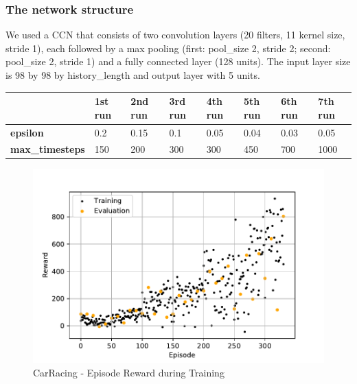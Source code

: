 \documentclass[
        a4paper,
        10pt,
        parskip = full,    %
    ]{scrartcl}
\begin{document}
\subsubsection{The network structure}
We used a CCN that consists of two convolution layers (20 filters, 11 kernel size, stride 1), each followed by a max
pooling (first: pool\_size 2, stride 2; second: pool\_size 2, stride 1) and a fully connected
layer (128 units). The input layer size is 98 by 98 by history\_length and output layer with 5 units.


\begin{center}
    \begin{tabular}{ | l | l | l | l | l | l | l | l |}
    \hline
                            & \textbf{1st run} & \textbf{2nd run} & \textbf{3rd run} &
                            \textbf{4th run} & \textbf{5th run} & \textbf{6th run} & \textbf{7th run} \\ \hline
    \textbf{epsilon}        &  0.2  &  0.15  &  0.1  &  0.05  &  0.04  &  0.03  &  0.05  \\ \hline
    \textbf{max\_timesteps} &  150  &  200   &  300  &  300   &  450   &  700   &  1000  \\ \hline
    \end{tabular}
\end{center}

\begin{figure}[H]
  \begin{center}
    \includegraphics{./images/CarRacing-v0/tb_train_eval_reward.pdf}
    \caption{CarRacing - Episode Reward during Training}
    \label{CarRacingTrainEvalReward}
  \end{center}
\end{figure}
\end{document}
